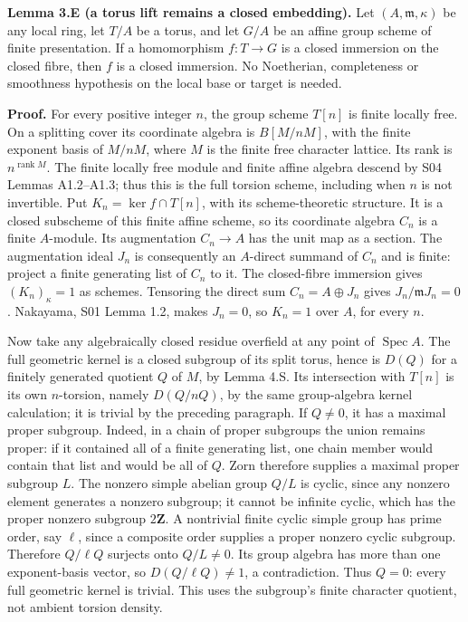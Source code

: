 \documentclass[11pt,a4paper,openany]{report}
\begin{document}
\textbf{Lemma 3.E (a torus lift remains a closed embedding).} Let \((A,\mathfrak m,\kappa)\) be any local ring, let \(T/A\) be a torus, and let \(G/A\) be an affine group scheme of finite presentation. If a homomorphism \(f:T\to G\) is a closed immersion on the closed fibre, then \(f\) is a closed immersion. No Noetherian, completeness or smoothness hypothesis on the local base or target is needed.

\textbf{Proof.} For every positive integer \(n\), the group scheme \(T[n]\) is finite locally free. On a splitting cover its coordinate algebra is \(B[M/nM]\), with the finite exponent basis of \(M/nM\), where \(M\) is the finite free character lattice. Its rank is \(n^{\operatorname{rank}M}\). The finite locally free module and finite affine algebra descend by S04 Lemmas A1.2--A1.3; thus this is the full torsion scheme, including when \(n\) is not invertible. Put \(K_n=\ker f\cap T[n]\), with its scheme-theoretic structure. It is a closed subscheme of this finite affine scheme, so its coordinate algebra \(C_n\) is a finite \(A\)-module. Its augmentation \(C_n\to A\) has the unit map as a section. The augmentation ideal \(J_n\) is consequently an \(A\)-direct summand of \(C_n\) and is finite: project a finite generating list of \(C_n\) to it. The closed-fibre immersion gives \((K_n)_\kappa=1\) as schemes. Tensoring the direct sum \(C_n=A\oplus J_n\) gives \(J_n/\mathfrak mJ_n=0\). Nakayama, S01 Lemma 1.2, makes \(J_n=0\), so \(K_n=1\) over \(A\), for every \(n\).

Now take any algebraically closed residue overfield at any point of \(\operatorname{Spec}A\). The full geometric kernel is a closed subgroup of its split torus, hence is \(D(Q)\) for a finitely generated quotient \(Q\) of \(M\), by Lemma 4.S. Its intersection with \(T[n]\) is its own \(n\)-torsion, namely \(D(Q/nQ)\), by the same group-algebra kernel calculation; it is trivial by the preceding paragraph. If \(Q\ne0\), it has a maximal proper subgroup. Indeed, in a chain of proper subgroups the union remains proper: if it contained all of a finite generating list, one chain member would contain that list and would be all of \(Q\). Zorn therefore supplies a maximal proper subgroup \(L\). The nonzero simple abelian group \(Q/L\) is cyclic, since any nonzero element generates a nonzero subgroup; it cannot be infinite cyclic, which has the proper nonzero subgroup \(2\mathbf Z\). A nontrivial finite cyclic simple group has prime order, say \(\ell\), since a composite order supplies a proper nonzero cyclic subgroup. Therefore \(Q/\ell Q\) surjects onto \(Q/L\ne0\). Its group algebra has more than one exponent-basis vector, so \(D(Q/\ell Q)\ne1\), a contradiction. Thus \(Q=0\): every full geometric kernel is trivial. This uses the subgroup's finite character quotient, not ambient torsion density.
\end{document}
